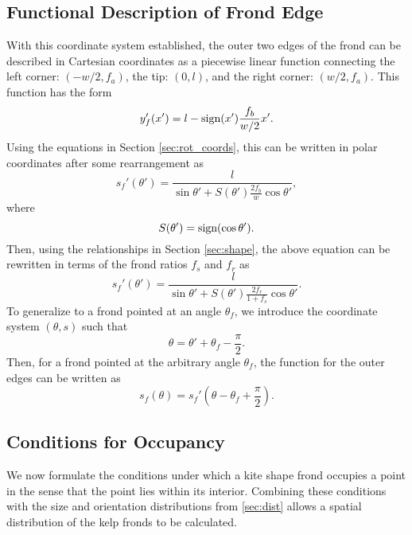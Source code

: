 \subsection{Functional Description of Frond Edge}
With this coordinate system established, the outer two edges of the frond can be described in Cartesian coordinates as a piecewise linear function connecting the left corner: $(-w/2,f_a)$, the tip: $(0,l)$, and the right corner: $(w/2,f_a)$.
This function has the form
\begin{equation*}
	y'_f(x') = l-\mbox{sign}(x')\frac{f_b}{w/2}x'.
\end{equation*}
Using the equations in Section \ref{sec:rot_coords}, this can be written in polar coordinates after some rearrangement as
\begin{equation*}
	s_f'(\theta') = \frac{l}{\sin\theta' + S(\theta')\frac{2f_b}{w}\cos\theta'},
\end{equation*}
where
\begin{equation*}
	S(\theta') = \mbox{sign}(\cos\theta').
\end{equation*}
Then, using the relationships in Section \ref{sec:shape}, the above equation can be rewritten in terms of the frond ratios $f_s$ and $f_r$ as
\begin{equation*}
	\label{eq:rf_rel}
	s_f'(\theta') = \frac{l}{\sin\theta' + S(\theta')\frac{2f_r}{1+f_s}\cos\theta'}.
\end{equation*}
To generalize to a frond pointed at an angle $\theta_f$, we introduce the coordinate system $(\theta,s)$ such that
\begin{equation*}
	\theta = \theta' + \theta_f - \frac{\pi}{2}.
\end{equation*}
Then, for a frond pointed at the arbitrary angle $\theta_f$, the function for the outer edges can be written as
\begin{equation*}
	\label{eq:rf_abs}
	s_f(\theta) = s_f'\left(\theta - \theta_f + \frac{\pi}{2} \right).
\end{equation*}

\subsection{Conditions for Occupancy}
We now formulate the conditions under which a kite shape frond occupies a point
in the sense that the point lies within its interior.
Combining these conditions with the size and orientation distributions from \ref{sec:dist}
allows a spatial distribution of the kelp fronds to be calculated.

